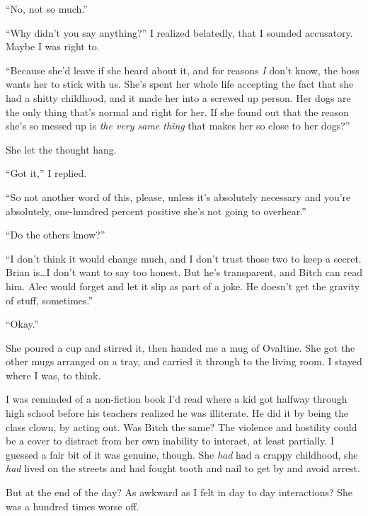 ``No, not so much.''



``Why didn't you say anything?''  I realized belatedly, that I sounded accusatory.  Maybe I was right to.



``Because she'd leave if she heard about it, and for reasons \emph{I} don't know, the boss wants her to stick with us.  She's spent her whole life accepting the fact that she had a shitty childhood, and it made her into a screwed up person.  Her dogs are the only thing that's normal and right for her.  If she found out that the reason she's so messed up is \emph{the very same thing} that makes her so close to her dogs?''



She let the thought hang.



``Got it,'' I replied.



``So not another word of this, please, unless it's absolutely necessary and you're absolutely, one-hundred percent positive she's not going to overhear.''



``Do the others know?''



``I don't think it would change much, and I don't trust those two to keep a secret.  Brian is\ldots I don't want to say too honest.  But he's transparent, and Bitch can read him.  Alec would forget and let it slip as part of a joke.  He doesn't get the gravity of stuff, sometimes.''



``Okay.''



She poured a cup and stirred it, then handed me a mug of Ovaltine.  She got the other mugs arranged on a tray, and carried it through to the living room.  I stayed where I was, to think.



I was reminded of a non-fiction book I'd read where a kid got halfway through high school before his teachers realized he was illiterate.  He did it by being the class clown, by acting out.  Was Bitch the same?  The violence and hostility could be a cover to distract from her own inability to interact, at least partially.  I guessed a fair bit of it was genuine, though.  She \emph{had} had a crappy childhood, she \emph{had} lived on the streets and had fought tooth and nail to get by and avoid arrest.



But at the end of the day?  As awkward as I felt in day to day interactions?  She was a hundred times worse off.





